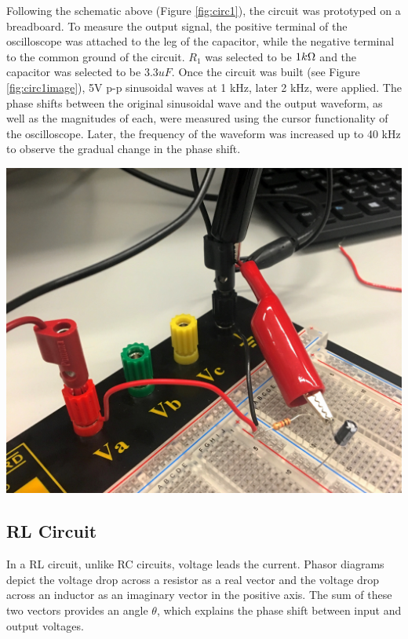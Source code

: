 \documentclass[journal]{IEEEtran}
\begin{document}
\noindent Following the schematic above (Figure \ref{fig:circ1}), the circuit was prototyped on a breadboard. To measure the output signal, the positive terminal of the oscilloscope was attached to the leg of the capacitor, while the negative terminal to the common ground of the circuit. $R_1$ was selected to be $1k\ohm$ and the capacitor was selected to be 3.3$uF$. Once the circuit was built (see Figure \ref{fig:circ1image}), 5V p-p sinusoidal waves at 1 kHz, later 2 kHz, were applied. The phase shifts between the original sinusoidal wave and the output waveform, as well  as the magnitudes of each, were measured using the cursor functionality of the oscilloscope. Later, the frequency of the waveform was increased up to 40 kHz to observe the gradual change in the phase shift.

\begingroup
    \centering
    \medskip
    \includegraphics[width=\columnwidth]{images/lab8_circ1.jpg}
    \label{fig:circ1image}
    \medskip
\endgroup



\subsection{RL Circuit}
\noindent In a RL circuit, unlike RC circuits, voltage leads the current. Phasor diagrams depict the voltage drop across a resistor as a real vector and the voltage drop across an inductor as an imaginary vector in the positive axis. The sum of these two vectors provides an angle $\theta$, which explains the phase shift between input and output voltages.\\
\end{document}
